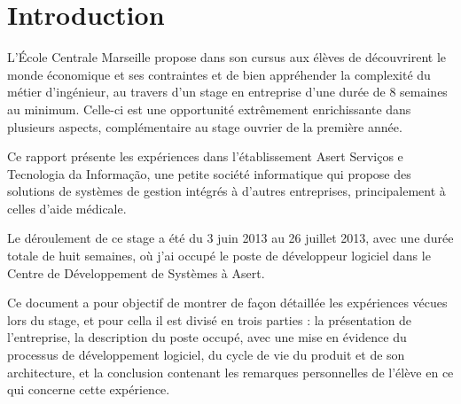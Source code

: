 \chapter{Introduction}

L'École Centrale Marseille propose dans son cursus aux élèves de découvrirent le monde économique et ses contraintes et de bien appréhender la complexité du métier d'ingénieur, au travers d'un stage en entreprise d'une durée de 8 semaines au minimum. Celle-ci est une opportunité extrêmement enrichissante dans plusieurs aspects, complémentaire au stage ouvrier de la première année. 

Ce rapport présente les expériences dans l'établissement Asert Serviços e Tecnologia da Informação, une petite société informatique qui propose des solutions de systèmes de gestion intégrés à d'autres entreprises, principalement à celles d'aide médicale.

Le déroulement de ce stage a été du 3 juin 2013 au 26 juillet 2013, avec une durée totale de huit semaines, où j'ai occupé le poste de développeur logiciel dans le Centre de Développement de Systèmes à Asert. 

Ce document a pour objectif de montrer de façon détaillée les expériences vécues lors du stage, et pour cella il est divisé en trois parties :  la présentation de l'entreprise, la description du poste occupé, avec une mise en évidence du processus de développement logiciel, du cycle de vie du produit et de son architecture, et la conclusion contenant les remarques personnelles de l'élève en ce qui concerne cette expérience.
